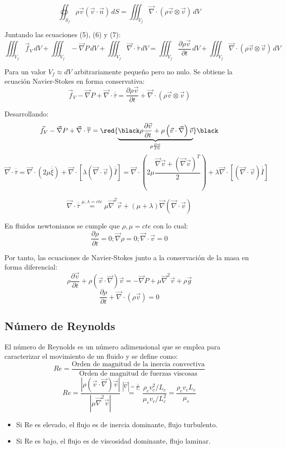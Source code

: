 \begin{equation}
\oiint_{S_f}\rho\vec{v}\left(\vec{v}\cdot\vec{n}\right)\,dS
=
\iiint_{V_f}\vec{\nabla}\cdot\left(\rho \vec{ v} \otimes \vec{v}\right)\,dV
\end{equation}

Juntando las ecuaciones (5), (6) y (7):
\[\iiint_{V_f}\vec{f}_V\,dV
+
\iiint_{V_f}-\vec{\nabla}P\,dV
+
\iiint_{V_f}\vec{\nabla}\cdot\overline{\overline{\tau}}\,dV
=
\iiint_{V_f}\frac{\partial \rho\vec{v}}{\partial t}\,dV
+
\iiint_{V_f}\vec{\nabla}\cdot\left(\rho \vec{ v} \otimes \vec{v}\right)\,dV
\]

Para un valor $V_f \approx dV$ arbitrariamente pequeño pero no nulo. Se obtiene la ecuación Navier-Stokes en forma conservativa:
\[
\vec{f}_V
-
\vec{\nabla}P
+
\vec{\nabla}\cdot\overline{\overline{\tau}}
=
\frac{\partial \rho\vec{v}}{\partial t}
+
\vec{\nabla}\cdot\left(\rho \vec{ v} \otimes \vec{v}\right)
\]

Desarrollando:
\[\vec{f}_V
-
\vec{\nabla}P
+
\vec{\nabla}\cdot\overline{\overline{\tau}}
=
\red{\underbrace{\black \rho\frac{\partial\vec{v}}{\partial t}
+
\rho \left(\vec{v}\cdot\vec{\nabla}\right)\vec{v}}_{\rho\frac{D\vec{v}}{Dt}}}\black\]
\[\vec{\nabla}\cdot\overline{\overline{\tau}}
=
\vec{\nabla}\cdot\left(2\mu\overline{\overline{\xi}}\right)
+
\vec{\nabla}\cdot\left[\lambda\left(\vec{\nabla}\cdot\vec{v}\right)\overline{\overline{I}}\right]
=
\vec{\nabla}\cdot\left(2\mu\frac{\vec{\nabla}\vec{v}+\left(\vec{\nabla}\vec{v}\right)^T}{2}\right)
+
\lambda\vec{\nabla}\cdot\left[\left(\vec{\nabla}\cdot\vec{v}\right)\overline{\overline{I}}\right]
\]

\[\vec{\nabla}\cdot\overline{\overline{\tau}}
	\stackrel{\mu,\lambda=cte}{=}
	\mu\vec{\nabla}^2\vec{v}+\left(\mu+\lambda\right)\vec{\nabla}\left(\vec{\nabla}\cdot\vec{v}\right)
	\]
	
En fluidos newtonianos se cumple que $\rho,\mu=cte$ con lo cual:
\[\frac{\partial \rho}{\partial t}=0; \vec{\nabla}\rho=0; \vec{\nabla}\cdot\vec{v}=0\]

Por tanto, las ecuaciones de Navier-Stokes junto a la conservación de la masa en forma diferencial:
\[\rho\frac{\partial \vec{v}}{\partial t}+\rho\left(\vec{v}\cdot\vec{\nabla}\right)\vec{v}=-\vec{\nabla}P+\mu\vec{\nabla}^2\vec{v}+\rho \vec{g}\]
\[\frac{\partial \rho}{\partial t} +\vec{\nabla}\cdot\left(\rho\vec{v}\right)=0\]
\subsection{Número de Reynolds}
El número de Reynolds es un número adimensional que se emplea para caracterizar el movimiento de un fluido y se define como:
\[Re=\frac{\text{Orden de magnitud de la inercia convectiva}}{\text{Orden de magnitud de fuerzas viscosas}}\]
\[Re=\frac{|\rho\left(\vec{v}\cdot\vec{\nabla}\right)\vec{v}|}{|\mu\vec{\nabla}^2\vec{v}|}
\stackrel{|\vec{\nabla}|=\frac{1}{L_c}}{=}\frac{\rho_c v^2_c/L_c}{\mu_c v_c/L^2_c}=\frac{\rho_c v_c L_c}{\mu_c}\]
\begin{itemize}
	\item Si Re es elevado, el flujo es de inercia dominante, flujo turbulento.
	\item Si Re es bajo, el flujo es de viscosidad dominante, flujo laminar.
\end{itemize}
